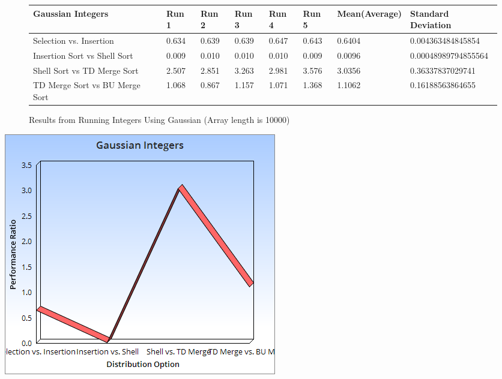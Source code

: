 \documentclass{article}
\begin{document}
\begin{figure}[H]
\centering
\begin{adjustwidth}{-3.4cm}{}
\begin{tabular}{| l | l | l | l | l | l | l | l |}
\hline
Gaussian Integers & Run 1 & Run 2 & Run 3 & Run 4 & Run 5 & Mean(Average) & Standard Deviation\\ \hline
Selection vs. Insertion & 0.634 & 0.639 & 0.639 & 0.647 & 0.643 & 0.6404 & 0.004363484845854  \\ \hline
Insertion Sort vs Shell Sort & 0.009 & 0.010 & 0.010 & 0.010 & 0.009 & 0.0096 & 0.00048989794855564 \\ \hline
Shell Sort vs TD Merge Sort & 2.507 & 2.851 & 3.263 & 2.981 & 3.576 & 3.0356 &   0.36337837029741 \\ \hline
TD Merge Sort vs BU Merge Sort & 1.068 & 0.867 & 1.157 & 1.071 & 1.368 & 1.1062 & 0.16188563864655 \\ \hline
\end{tabular}
\caption{Results from Running Integers Using Gaussian (Array length is 10000)}
\end{adjustwidth}
\end{figure}

\includegraphics[scale=0.5]{GaussianIntegers.png}
\end{document}
